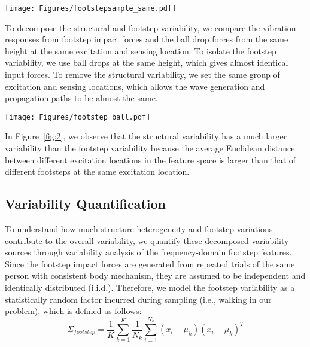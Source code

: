 \documentclass[11pt,letter]{article}
\begin{document}
\begin{multicols*}{2}
\texttt{[image: Figures/footstepsample\_same.pdf]}
\label{fig:1}

To decompose the structural and footstep variability, we compare the vibration responses from footstep impact forces and the ball drop forces from the same height at the same excitation and sensing location. To isolate the footstep variability, we use ball drops at the same height, which gives almost identical input forces. To remove the structural variability, we set the same group of excitation and sensing locations, which allows the wave generation and propagation paths to be almost the same.

\texttt{[image: Figures/footstep\_ball.pdf]}
\label{fig:2}

In Figure~\ref{fig:2}, we observe that the structural variability has a much larger variability than the footstep variability because the average Euclidean distance between different excitation locations in the feature space is larger than that of different footsteps at the same excitation location.

\subsection{Variability Quantification}
To understand how much structure heterogeneity and footstep variations contribute to the overall variability, we quantify these decomposed variability sources through variability analysis of the frequency-domain footstep features. Since the footstep impact forces are generated from repeated trials of the same person with consistent body mechanism, they are assumed to be independent and identically distributed (i.i.d.). Therefore, we model the footstep variability as a statistically random factor incurred during sampling (i.e., walking in our problem), which is defined as follows:
\begin{equation}
    \Sigma_{footstep} = \frac{1}{K} \sum_{k=1}^{K} \frac{1}{N_k} \sum_{i=1}^{N_k} (x_i - \mu_k)(x_i - \mu_k)^T
    \label{eq:footstepvar}
\end{equation}


\end{multicols*}
\end{document}
